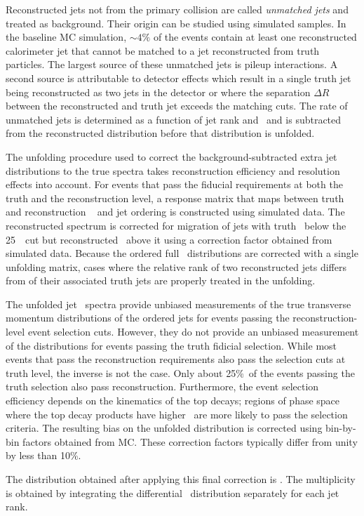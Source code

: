 Reconstructed jets not from the primary collision are called \textit{unmatched jets} and treated as
background.  Their origin can be studied using simulated samples. In the baseline MC simulation, $\sim 4\%$ of the events 
contain at least one reconstructed calorimeter
jet that cannot be matched to a jet reconstructed from truth particles.  The largest
source of these unmatched jets is pileup interactions.  A second
source is attributable to  detector effects which result in a single truth jet being reconstructed as
two jets in the detector or where  the separation  $\Delta R$ between the reconstructed and truth jet
exceeds the matching cuts.  The rate of unmatched jets is determined as a function of
jet rank and  \pT\ and  is subtracted from the reconstructed distribution before that distribution is
unfolded.

The unfolding procedure used to correct the background-subtracted extra jet \pt~  distributions to the true
spectra takes  reconstruction efficiency and resolution effects
into account.  For events that pass the fiducial requirements at both the truth and the reconstruction level,
a response matrix that maps between truth and reconstruction \pt~ and jet ordering is constructed using simulated data.  The reconstructed spectrum is corrected for migration
of jets with truth \pT\ below the 25~\GeV\ cut but reconstructed \pT\ above it using
a correction factor obtained from simulated data. 
Because the ordered full \pT\  distributions
are corrected with a single unfolding matrix, cases where the relative rank of two reconstructed jets
differs from of their associated truth jets are properly treated in the unfolding.  


The unfolded jet \pT\ spectra provide unbiased measurements of the true transverse momentum distributions of the ordered
jets for events passing the reconstruction-level event selection cuts.   However, they do 
not provide an unbiased measurement of the distributions for events passing the truth fidicial selection.
While most events that pass the reconstruction requirements
also pass the selection cuts at truth level, the inverse is not the case. Only about 25\%\ of the events
passing the truth selection also pass reconstruction.  Furthermore, the event selection efficiency
depends on the kinematics of the top decays;  regions of phase space where the top decay
products have higher \pT\ are more likely to pass the selection criteria.  The resulting bias on
the unfolded distribution is corrected  using bin-by-bin  factors obtained from MC.  
These correction factors typically differ from unity by less than 10\%.


The distribution obtained
after applying this final correction is \sigmapti.  The multiplicity
is obtained by integrating the differential \pT\ distribution separately for each jet rank.



